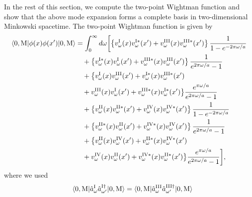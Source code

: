\documentclass[aps,prd,preprintnumbers,nofootinbib,showpacs,11pt]{revtex4}%
\begin{document}
\begin{widetext}
In the rest of this section,
 we compute the two-point Wightman function and show that the above mode expansion
forms a complete basis in two-dimensional Minkowski spacetime.
The two-point Wightman function is given by
\begin{equation}
\begin{split}
\langle0,{\rm M}|\phi(x)\phi(x')|0,{\rm M}\rangle&=\int_0^\infty d\omega \biggl[\left\{
v_{\omega}^{\rm I}(x)v_{\omega}^{\rm I*}(x')
+v_{\omega}^{\rm III}(x)v_{\omega}^{\rm III*}(x')
\right\}{1\over 1-e^{-2\pi\omega/a}}\\
&\quad+\left\{
v_{\omega}^{\rm I*}(x)v_{\omega}^{\rm I}(x')
+v_{\omega}^{\rm III*}(x)v_{\omega}^{\rm III}(x')
\right\}{1\over e^{2\pi\omega/a}-1}\\
&\quad+\bigl\{
v_{\omega}^{\rm I}(x)v_{\omega}^{\rm III}(x')
+v_{\omega}^{\rm I*}(x)v_{\omega}^{\rm III*}(x')
\\
&\quad+
v_{\omega}^{\rm III}(x)v_{\omega}^{\rm I}(x')
+v_{\omega}^{\rm III*}(x)v_{\omega}^{\rm I*}(x')
\bigr\}{e^{\pi\omega/a}\over e^{2\pi\omega/a}-1}
\\
&\quad+\left\{v_{\omega}^{\rm II}(x)v_{\omega}^{\rm II*}(x')
+v_{\omega}^{\rm IV}(x)v_{\omega}^{\rm IV*}(x')
\right\}{1\over 1-e^{-2\pi\omega/a}}
\\
&\quad+\left\{
v_{\omega}^{\rm II*}(x)v_{\omega}^{\rm II}(x')
+v_{\omega}^{\rm IV*}(x)v_{\omega}^{\rm IV}(x')
\right\}{1\over e^{2\pi\omega/a}-1}\\
&\quad +\bigl\{
v_{\omega}^{\rm II}(x)v_{\omega}^{\rm IV}(x')
+v_{\omega}^{\rm II*}(x)v_{\omega}^{\rm IV*}(x')
\\
&\quad+
v_{\omega}^{\rm IV}(x)v_{\omega}^{\rm II}(x')
+v_{\omega}^{\rm IV*}(x)v_{\omega}^{\rm II*}(x')
\bigr\}{e^{\pi\omega/a}\over e^{2\pi\omega/a}-1}\biggr],
\end{split}\end{equation}
where we used
\begin{eqnarray}
&& \langle0,{\rm M}|\hat a_{\omega}^{\rm I}\hat a_{\omega'}^{\rm I \dagger}|0,{\rm M}\rangle
=\langle0,{\rm M}|\hat a_{\omega}^{\rm III}\hat a_{\omega'}^{\rm III \dagger}|0,{\rm M}\rangle

\end{eqnarray}
\end{widetext}
\end{document}
